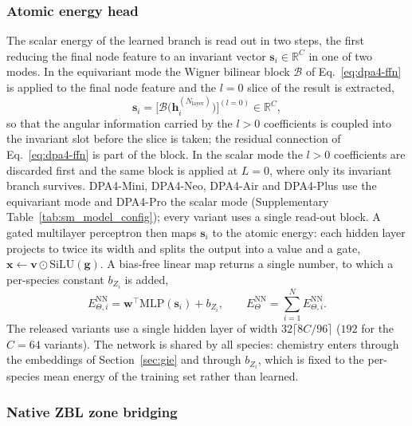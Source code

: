 \subsubsection{Atomic energy head}
\label{sec:ener-head}

The scalar energy of the learned branch is read out in two steps, the first reducing the final node feature to an invariant vector $\mathbf{s}_i\in\mathbb{R}^{C}$ in one of two modes.
In the equivariant mode the Wigner bilinear block $\mathcal{B}$ of Eq.~\eqref{eq:dpa4-ffn} is applied to the final node feature and the $l=0$ slice of the result is extracted,
\begin{equation}
    \mathbf{s}_i = \bigl[\mathcal{B}\bigl(\mathbf{h}_i^{(N_{\mathrm{layer}})}\bigr)\bigr]^{(l=0)}
    \in\mathbb{R}^{C},
    \label{eq:dpa4-readout}
\end{equation}
so that the angular information carried by the $l>0$ coefficients is coupled into the invariant slot before the slice is taken; the residual connection of Eq.~\eqref{eq:dpa4-ffn} is part of the block.
In the scalar mode the $l>0$ coefficients are discarded first and the same block is applied at $L=0$, where only its invariant branch survives.
DPA4-Mini, DPA4-Neo, DPA4-Air and DPA4-Plus use the equivariant mode and DPA4-Pro the scalar mode (Supplementary Table~\ref{tab:sm_model_config}); every variant uses a single read-out block.
A gated multilayer perceptron then maps $\mathbf{s}_i$ to the atomic energy: each hidden layer projects to twice its width and splits the output into a value and a gate, $\mathbf{x}\leftarrow\mathbf{v}\odot\mathrm{SiLU}(\mathbf{g})$.
A bias-free linear map returns a single number, to which a per-species constant $b_{Z_i}$ is added,
\begin{equation}
    E^{\mathrm{NN}}_{\Theta,i}=\mathbf{w}^{\top}\mathrm{MLP}(\mathbf{s}_i)+b_{Z_i},
    \qquad
    E^{\mathrm{NN}}_{\Theta}=\sum_{i=1}^{N}E^{\mathrm{NN}}_{\Theta,i}.
    \label{eq:dpa4-ener-head}
\end{equation}
The released variants use a single hidden layer of width $32\lceil 8C/96\rceil$ ($192$ for the $C=64$ variants).
The network is shared by all species: chemistry enters through the embeddings of Section~\ref{sec:gie} and through $b_{Z_i}$, which is fixed to the per-species mean energy of the training set rather than learned.

\subsubsection{Native ZBL zone bridging}
\label{sec:zbl_method}

